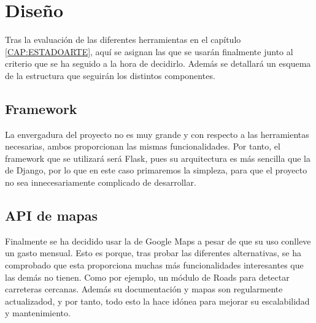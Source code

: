   
\section{Diseño\label{SEC:DISENO}}
  Tras la evaluación de las diferentes herramientas en el capítulo \ref{CAP:ESTADOARTE}, aquí se asignan las que se usarán finalmente junto al criterio que se ha seguido a la hora de decidirlo. Además se detallará un esquema de la estructura que seguirán los distintos componentes.
  
  
  \subsection{Framework}
    La envergadura del proyecto no es muy grande y con respecto a las herramientas necesarias, ambos proporcionan las mismas funcionalidades. Por tanto, el framework que se utilizará será Flask, pues su arquitectura es más sencilla que la de Django, por lo que en este caso primaremos la simpleza, para que el proyecto no sea innecesariamente complicado de desarrollar.

  \subsection{API de mapas}
    Finalmente se ha decidido usar la  de Google Maps\cite{gmaps} a pesar de que su uso conlleve un gasto mensual. Esto es porque, tras probar las diferentes alternativas, se ha comprobado que esta  proporciona muchas más funcionalidades interesantes que las demás no tienen. Como por ejemplo, un módulo de Roads para detectar carreteras cercanas.
    Además su documentación y mapas son regularmente actualizadod, y por tanto, todo esto la hace idónea para mejorar su escalabilidad y mantenimiento.
    
